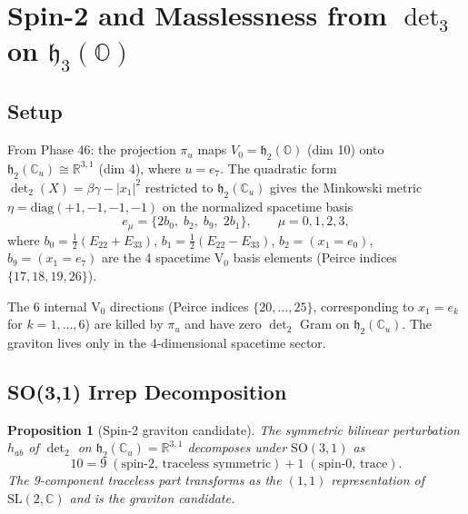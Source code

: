 \documentclass[11pt]{article}
\newtheorem{proposition}{Proposition}
\newcommand{\h}{\mathfrak{h}}
\begin{document}
\section{Spin-2 and Masslessness from $\det_3$ on $\h_3(\mathbb{O})$}

\subsection{Setup}

From Phase 46: the projection $\pi_u$ maps $V_0 = \h_2(\mathbb{O})$ (dim 10) onto
$\h_2(\mathbb{C}_u) \cong \mathbb{R}^{3,1}$ (dim 4), where $u = e_7$.
The quadratic form $\det_2(X) = \beta\gamma - |x_1|^2$ restricted to
$\h_2(\mathbb{C}_u)$ gives the Minkowski metric
$\eta = \mathrm{diag}(+1,-1,-1,-1)$ on the normalized spacetime basis
\begin{equation}\label{eq:50.1}
  e_\mu = \{2b_0,\; b_2,\; b_9,\; 2b_1\},
  \qquad \mu = 0,1,2,3,
\end{equation}
where $b_0 = \tfrac{1}{2}(E_{22}+E_{33})$, $b_1 = \tfrac{1}{2}(E_{22}-E_{33})$,
$b_2 = (x_1 = e_0)$, $b_9 = (x_1 = e_7)$ are the 4 spacetime V$_0$ basis elements
(Peirce indices $\{17,18,19,26\}$).

The 6 internal V$_0$ directions (Peirce indices $\{20,\ldots,25\}$,
corresponding to $x_1 = e_k$ for $k=1,\ldots,6$) are killed by $\pi_u$
and have zero $\det_2$ Gram on $\h_2(\mathbb{C}_u)$. The graviton lives
only in the 4-dimensional spacetime sector.

\subsection{SO(3,1) Irrep Decomposition}

\begin{proposition}[Spin-2 graviton candidate]\label{prop:spin2}
The symmetric bilinear perturbation $h_{ab}$ of $\det_2$ on
$\h_2(\mathbb{C}_u) = \mathbb{R}^{3,1}$ decomposes under $\mathrm{SO}(3,1)$ as
\begin{equation}\label{eq:50.2}
  10 = 9\;(\text{spin-2, traceless symmetric}) + 1\;(\text{spin-0, trace}).
\end{equation}
The 9-component traceless part transforms as the $(1,1)$ representation
of $\mathrm{SL}(2,\mathbb{C})$ and is the graviton candidate.
\end{proposition}
\end{document}
